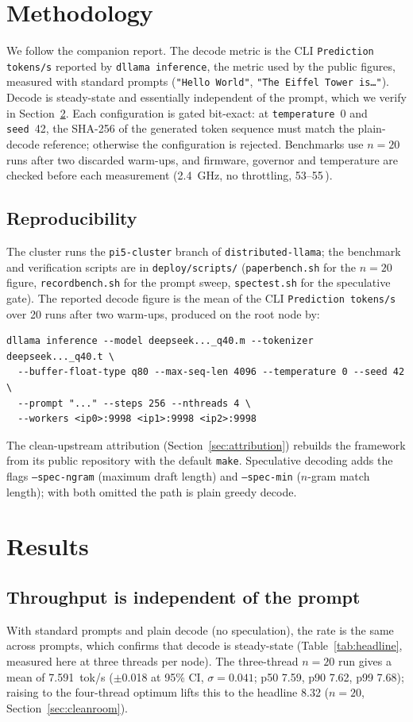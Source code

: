 \documentclass[10pt,a4paper]{article}
\begin{document}
\section{Methodology}
We follow the companion report. The decode metric is the CLI \texttt{Prediction tokens/s} reported by \texttt{dllama inference}, the metric used by the public figures, measured with standard prompts (\texttt{"Hello World"}, \texttt{"The Eiffel Tower is\ldots"}). Decode is steady-state and essentially independent of the prompt, which we verify in Section~\ref{sec:results}. Each configuration is gated bit-exact: at \texttt{temperature}~0 and \texttt{seed}~42, the SHA-256 of the generated token sequence must match the plain-decode reference; otherwise the configuration is rejected. Benchmarks use $n{=}20$ runs after two discarded warm-ups, and firmware, governor and temperature are checked before each measurement (2.4~GHz, no throttling, 53--55\,\textcelsius).

\subsection{Reproducibility}
The cluster runs the \texttt{pi5-cluster} branch of \texttt{distributed-llama}; the benchmark and verification scripts are in \texttt{deploy/scripts/} (\texttt{paperbench.sh} for the $n{=}20$ figure, \texttt{recordbench.sh} for the prompt sweep, \texttt{spectest.sh} for the speculative gate). The reported decode figure is the mean of the CLI \texttt{Prediction tokens/s} over 20 runs after two warm-ups, produced on the root node by:
\begin{lstlisting}
dllama inference --model deepseek..._q40.m --tokenizer deepseek..._q40.t \
  --buffer-float-type q80 --max-seq-len 4096 --temperature 0 --seed 42 \
  --prompt "..." --steps 256 --nthreads 4 \
  --workers <ip0>:9998 <ip1>:9998 <ip2>:9998
\end{lstlisting}
The clean-upstream attribution (Section~\ref{sec:attribution}) rebuilds the framework from its public repository with the default \texttt{make}. Speculative decoding adds the flags \texttt{--spec-ngram} (maximum draft length) and \texttt{--spec-min} ($n$-gram match length); with both omitted the path is plain greedy decode.

\section{Results}
\label{sec:results}

\subsection{Throughput is independent of the prompt}
With standard prompts and plain decode (no speculation), the rate is the same across prompts, which confirms that decode is steady-state (Table~\ref{tab:headline}, measured here at three threads per node). The three-thread $n{=}20$ run gives a mean of 7.591~tok/s ($\pm$0.018 at 95\% CI, $\sigma=0.041$; p50 7.59, p90 7.62, p99 7.68); raising to the four-thread optimum lifts this to the headline 8.32 ($n{=}20$, Section~\ref{sec:cleanroom}).
\end{document}
